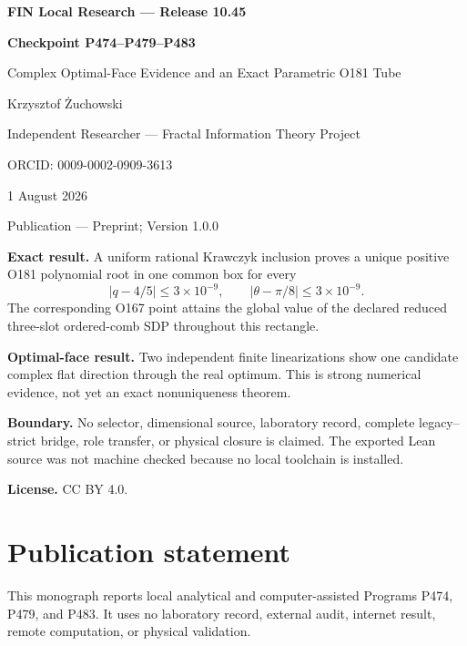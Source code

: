 \documentclass[11pt,a4paper,openany]{report}
\begin{document}
\hypersetup{pageanchor=false}
\begin{titlepage}\centering\vspace*{8mm}
{\Large\bfseries FIN Local Research --- Release 10.45\par}\vspace{10mm}
{\Huge\bfseries Checkpoint P474--P479--P483\par}\vspace{6mm}
{\Large Complex Optimal-Face Evidence and an Exact Parametric O181 Tube\par}\vspace{14mm}
{\Large Krzysztof \.Zuchowski\par}\vspace{2mm}
{\normalsize Independent Researcher --- Fractal Information Theory Project\par}
{\normalsize ORCID: 0009-0002-0909-3613\par}\vspace{8mm}
{\large 1 August 2026\par}{\normalsize Publication --- Preprint; Version 1.0.0\par}
\vfill
\begin{minipage}{0.92\textwidth}\small
\textbf{Exact result.} A uniform rational Krawczyk inclusion proves a unique
positive O181 polynomial root in one common box for every
\[
|q-4/5|\le3\times10^{-9},\qquad
|\theta-\pi/8|\le3\times10^{-9}.
\]
The corresponding O167 point attains the global value of the declared
reduced three-slot ordered-comb SDP throughout this rectangle.

\medskip\textbf{Optimal-face result.} Two independent finite linearizations
show one candidate complex flat direction through the real optimum. This is
strong numerical evidence, not yet an exact nonuniqueness theorem.

\medskip\textbf{Boundary.} No selector, dimensional source, laboratory
record, complete legacy--strict bridge, role transfer, or physical closure is
claimed. The exported Lean source was not machine checked because no local
toolchain is installed.

\medskip\textbf{License.} CC BY 4.0.
\end{minipage}\vfill\end{titlepage}
\hypersetup{pageanchor=true}
\chapter*{Publication statement}
This monograph reports local analytical and computer-assisted Programs P474,
P479, and P483. It uses no laboratory record, external audit, internet
result, remote computation, or physical validation.
\tableofcontents\clearpage{}
\end{document}
